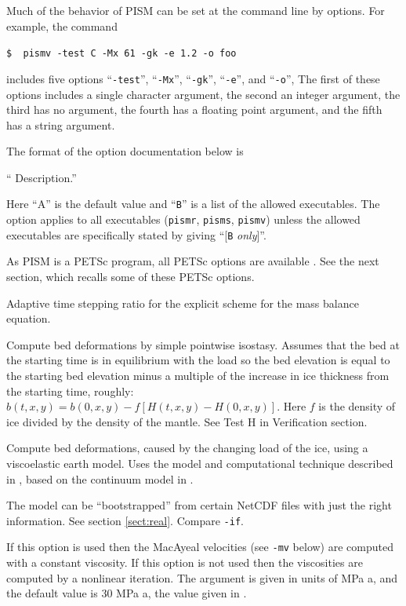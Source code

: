 \documentclass[11pt,final]{amsart}
\renewcommand{\t}[1]{\texttt{#1}}
\begin{document}
Much of the behavior of PISM can be set at the command line by options.  For example, the command 

\verb|$  pismv -test C -Mx 61 -gk -e 1.2 -o foo|

\noindent includes five options ``\verb|-test|'', ``\verb|-Mx|'', ``\verb|-gk|'', ``\verb|-e|'', and ``\verb|-o|'',  The first of these options includes a single character argument, the second an integer argument, the third has no argument, the fourth has a floating point argument, and the fifth has a string argument.

The format of the option documentation below is

\centerline{`` Description.''}

\noindent Here ``A'' is the default value and ``\t{B}'' is a list of the allowed executables.  The option applies to all executables (\verb|pismr|, \verb|pisms|, \verb|pismv|) unless the allowed executables are specifically stated by giving ``[\t{B} \textsl{only}]''.

As PISM is a PETSc program, all PETSc options are available \cite{petsc-user-ref}.  See the next section, which recalls some of these PETSc options.
\bigskip

  Adaptive time stepping ratio for the explicit scheme for the mass balance equation.

 Compute bed deformations by simple pointwise isostasy.  Assumes that the bed at the starting time is in equilibrium with the load so the bed elevation is equal to the starting bed elevation minus a multiple of the increase in ice thickness from the starting time, roughly: $b(t,x,y) = b(0,x,y) - f [H(t,x,y) - H(0,x,y)]$.  Here $f$ is the density of ice divided by the density of the mantle.  See Test H in Verification section.

 Compute bed deformations, caused by the changing load of the ice, using a viscoelastic earth model.  Uses the model and computational technique described in \cite{BLKfastearth}, based on the continuum model in \cite{LingleClark}.

  The model can be ``bootstrapped'' from certain NetCDF files with just the right information.  See section \ref{sect:real}.  Compare \verb|-if|.

  If this option is used then the MacAyeal velocities (see \verb|-mv| below) are computed with a constant viscosity.  If this option is not used then the viscosities are computed by a nonlinear iteration.  The argument is given in units of MPa a, and the default value is $30$ MPa a, the value given in \cite{Ritzetal2001}.
\end{document}
